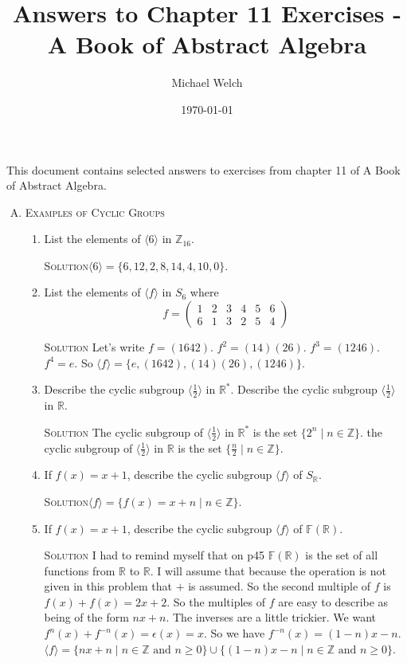 \documentclass[twoside]{amsart}
\newcommand{\Reals}{\ensuremath{\mathbb{R}}\xspace}
\newcommand{\Integers}{\ensuremath{\mathbb{Z}{}}\xspace}
\newcommand{\solution}{\textsc{Solution}\xspace}
\newcommand{\blank}{\vspace{5pt}}
\newcommand{\itm}{\blank\item}
\newcommand{\sol}{\blank\noindent\solution}
\begin{document}
\title{Answers to Chapter 11 Exercises - A Book of Abstract Algebra}
\author{Michael Welch}
\date{\today}
\maketitle

This document contains selected answers to exercises from chapter 11
of A Book of Abstract Algebra.


\begin{enumerate}[A.]
   
   \item \textsc{Examples of Cyclic Groups}

   \begin{enumerate}[1)]
      \itm List the elements of $\langle 6 \rangle$ in $\Integers_{16}$.

      \sol $\langle 6 \rangle = \{ 6, 12, 2, 8, 14, 4, 10, 0 \}$.

      \itm List the elements of $\langle f \rangle$ in $S_6$ where
      \[
         f = 
            \begin{pmatrix}
               1 & 2 & 3 & 4 & 5 & 6 \\
               6 & 1 & 3 & 2 & 5 & 4
            \end{pmatrix}
      \]

      \sol Let's write $f = (1642)$. $f^2 = (14)(26)$. $f^3 = (1246)$.
      $f^4 = e$. So $\langle f \rangle = \{ e, (1642), (14)(26), (1246) \}$.

      \itm Describe the cyclic subgroup $\langle \frac{1}{2} \rangle$ in 
      $\Reals^*$. Describe the cyclic subgroup $\langle \frac{1}{2} \rangle$
      in $\Reals$.

      \sol The cyclic subgroup of $\langle \frac{1}{2} \rangle$ in 
      $\Reals^*$ is the set $\{ 2^n \mid n \in \Integers\}$.
      the cyclic subgroup of $\langle \frac{1}{2} \rangle$ in $\Reals$
      is the set $\{ \frac{n}{2} \mid n \in \Integers \}$.

      \itm If $f(x) = x + 1$, describe the cyclic subgroup $\langle f
      \rangle$ of $S_\Reals$.

      \sol $\langle f \rangle = \{ f(x) = x + n \mid n \in \Integers \}$.

      \itm If $f(x) = x + 1$, describe the cyclic subgroup $\langle f
      \rangle$ of $\mathbb{F}(\Reals)$.

      \sol I had to remind myself that on p45 $\mathbb{F}(\Reals)$ is 
      the set of all functions from $\Reals$ to $\Reals$. I will assume that
      because the operation is not given in this problem that $+$ is assumed.
      So the second multiple of $f$ is $f(x) + f(x) = 2x + 2$.  So
      the multiples of $f$ are easy to describe as being of the
      form $nx + n$. The inverses are a little trickier. We want 
      $f^n(x) + f^{-n}(x) = \epsilon(x) = x$. So we have 
      $f^{-n}(x) = (1-n)x - n $.
      $\langle f \rangle = \{ nx + n \mid n \in \Integers \text{ and } n \ge
      0\} \cup \{(1-n)x - n \mid n \in \Integers \text{ and } n \ge 0\}$.


\end{enumerate}
\end{enumerate}
\end{document}
